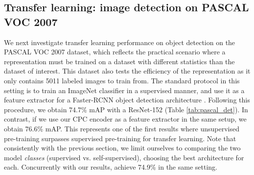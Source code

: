 \documentclass{article}
\begin{document}
\subsection{Transfer learning: image detection on PASCAL VOC 2007}
\label{sec:experiments-pascal}
We next investigate transfer learning performance on object detection on the PASCAL VOC 2007 dataset, which reflects the practical scenario where a representation must be trained on a dataset with different statistics than the dataset of interest. This dataset also tests the efficiency of the representation as it only contains 5011 labeled images to train from. The standard protocol in this setting is to train an ImageNet classifier in a supervised manner, and use it as a feature extractor for a Faster-RCNN object detection architecture \citep{ren2015faster}. Following this procedure, we obtain 74.7\% mAP with a ResNet-152 (Table \ref{tab:pascal_det}). In contrast, if we use our CPC encoder as a feature extractor in the same setup, we obtain 76.6\% mAP. This represents one of the first results where unsupervised pre-training surpasses supervised pre-training for transfer learning. Note that consistently with the previous section, we limit ourselves to comparing the two model \textit{classes} (supervised vs. self-supervised), choosing the best architecture for each. Concurrently with our results, \citet{he2019momentum} achieve 74.9\% in the same setting.
\end{document}
